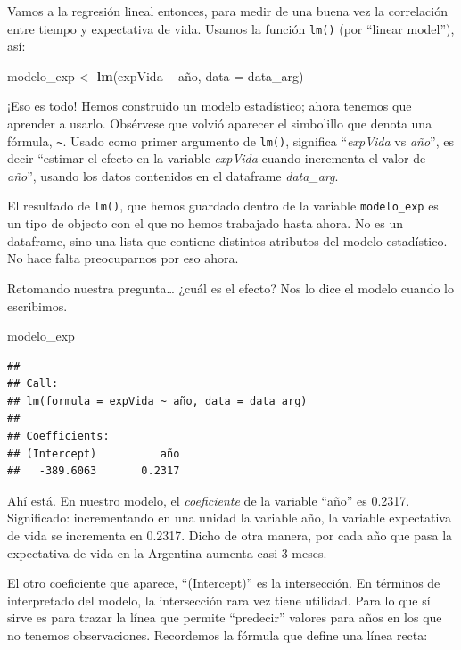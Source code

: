 \documentclass[spanish,]{book}
\newenvironment{Shaded}{\begin{snugshade}}{\end{snugshade}}
\newcommand{\DataTypeTok}[1]{\textcolor[rgb]{0.13,0.29,0.53}{#1}}
\newcommand{\KeywordTok}[1]{\textcolor[rgb]{0.13,0.29,0.53}{\textbf{#1}}}
\newcommand{\NormalTok}[1]{#1}
\newcommand{\OperatorTok}[1]{\textcolor[rgb]{0.81,0.36,0.00}{\textbf{#1}}}
\newcommand{\StringTok}[1]{\textcolor[rgb]{0.31,0.60,0.02}{#1}}
\begin{document}
Vamos a la regresión lineal entonces, para medir de una buena vez la correlación entre tiempo y expectativa de vida. Usamos la función \texttt{lm()} (por ``linear model''), así:

\begin{Shaded}
\begin{Highlighting}[]
\NormalTok{modelo_exp <-}\StringTok{ }\KeywordTok{lm}\NormalTok{(expVida }\OperatorTok{~}\StringTok{ }\NormalTok{año, }\DataTypeTok{data =}\NormalTok{ data_arg)}
\end{Highlighting}
\end{Shaded}

¡Eso es todo! Hemos construido un modelo estadístico; ahora tenemos que aprender a usarlo. Obsérvese que volvió aparecer el simbolillo que denota una fórmula, \texttt{\textasciitilde{}}. Usado como primer argumento de \texttt{lm()}, significa ``\emph{expVida} vs \emph{año}'', es decir ``estimar el efecto en la variable \emph{expVida} cuando incrementa el valor de \emph{año}'', usando los datos contenidos en el dataframe \emph{data\_arg}.

El resultado de \texttt{lm()}, que hemos guardado dentro de la variable \texttt{modelo\_exp} es un tipo de objecto con el que no hemos trabajado hasta ahora. No es un dataframe, sino una lista que contiene distintos atributos del modelo estadístico. No hace falta preocuparnos por eso ahora.

Retomando nuestra pregunta\ldots{} ¿cuál es el efecto? Nos lo dice el modelo cuando lo escribimos.

\begin{Shaded}
\begin{Highlighting}[]
\NormalTok{modelo_exp}
\end{Highlighting}
\end{Shaded}

\begin{verbatim}
## 
## Call:
## lm(formula = expVida ~ año, data = data_arg)
## 
## Coefficients:
## (Intercept)          año  
##   -389.6063       0.2317
\end{verbatim}

Ahí está. En nuestro modelo, el \emph{coeficiente} de la variable ``año'' es 0.2317. Significado: incrementando en una unidad la variable año, la variable expectativa de vida se incrementa en 0.2317. Dicho de otra manera, por cada año que pasa la expectativa de vida en la Argentina aumenta casi 3 meses.

El otro coeficiente que aparece, ``(Intercept)'' es la intersección. En términos de interpretado del modelo, la intersección rara vez tiene utilidad. Para lo que sí sirve es para trazar la línea que permite ``predecir'' valores para años en los que no tenemos observaciones. Recordemos la fórmula que define una línea recta:
\end{document}
